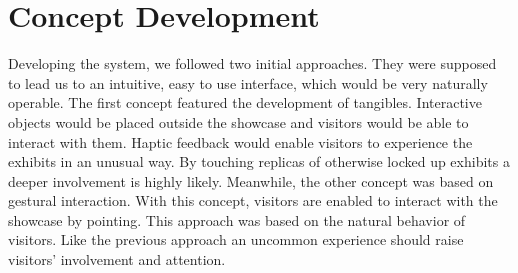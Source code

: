 %


%


\section{Concept Development}
\label{conception_constraints}

Developing the system, we followed two initial approaches. They were supposed to lead us to an intuitive, easy to use interface, which would be very naturally operable. The first concept featured the development of tangibles. Interactive objects would be placed outside the showcase and visitors would be able to interact with them. Haptic feedback would enable visitors to experience the exhibits in an unusual way. By touching replicas of otherwise locked up exhibits a deeper involvement is highly likely. Meanwhile, the other concept was based on gestural interaction. With this concept, visitors are enabled to interact with the showcase by pointing. This approach was based on the natural behavior of visitors. Like the previous approach an uncommon experience should raise visitors' involvement and attention.

